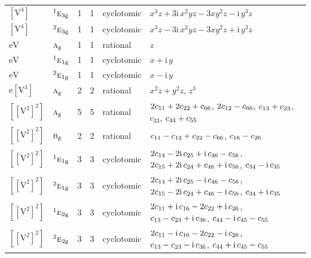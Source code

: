\documentclass[10pt,a4paper]{article}
\numberwithin{equation}{section}
\newcommand{\irr}[1]{\text{\normalfont\scshape #1}}
\newcommand{\conjpair}[1]{{}^{#1}}
\newcommand{\ptag}[1]{\mathrm{#1}}
\newcommand{\iunit}{\mathrm{i}}
\newcommand{\jahn}[1]{\mathrm{#1}}
\newlength{\fillwidth}\newlength{\cellwidth}\newlength{\colwidth}
\newcommand{\signbreak}{\penalty100\relax}
\begin{document}
{\begin{longtable}{@{}llrrl>{\RaggedRight\arraybackslash}p{\fillwidth}@{}}
$\jahn{[V^{4}]}$ & $\conjpair{1}\irr{e}_{3\ptag{g}}$ & 1 & 1 & cyclotomic & $x^{3}z + 3\iunit{}\,x^{2}yz - 3xy^{2}z - \iunit{}\,y^{3}z$\\
$\jahn{[V^{4}]}$ & $\conjpair{2}\irr{e}_{3\ptag{g}}$ & 1 & 1 & cyclotomic & $x^{3}z - 3\iunit{}\,x^{2}yz - 3xy^{2}z + \iunit{}\,y^{3}z$\\
$\jahn{eV}$ & $\irr{a}_{\ptag{g}}$ & 1 & 1 & rational & $z$\\
$\jahn{eV}$ & $\conjpair{1}\irr{e}_{1\ptag{g}}$ & 1 & 1 & cyclotomic & $x + \iunit{}\,y$\\
$\jahn{eV}$ & $\conjpair{2}\irr{e}_{1\ptag{g}}$ & 1 & 1 & cyclotomic & $x - \iunit{}\,y$\\
$\jahn{e[V^{3}]}$ & $\irr{a}_{\ptag{g}}$ & 2 & 2 & rational & $x^{2}z + y^{2}z$, $z^{3}$\\
$\jahn{[[V^{2}]^{2}]}$ & $\irr{a}_{\ptag{g}}$ & 5 & 5 & rational & $2c_{11} +\signbreak 2c_{22} +\signbreak c_{66}$, $2c_{12} -\signbreak c_{66}$, $c_{13} +\signbreak c_{23}$, $c_{33}$, $c_{44} +\signbreak c_{55}$\\
$\jahn{[[V^{2}]^{2}]}$ & $\irr{b}_{\ptag{g}}$ & 2 & 2 & rational & $c_{11} -\signbreak c_{12} +\signbreak c_{22} -\signbreak c_{66}$, $c_{16} -\signbreak c_{26}$\\
$\jahn{[[V^{2}]^{2}]}$ & $\conjpair{1}\irr{e}_{1\ptag{g}}$ & 3 & 3 & cyclotomic & $2c_{14} -\signbreak 2\iunit{}\,c_{25} +\signbreak \iunit{}\,c_{46} -\signbreak c_{56}$, $2c_{15} +\signbreak 2\iunit{}\,c_{24} +\signbreak c_{46} +\signbreak \iunit{}\,c_{56}$, $c_{34} -\signbreak \iunit{}\,c_{35}$\\
$\jahn{[[V^{2}]^{2}]}$ & $\conjpair{2}\irr{e}_{1\ptag{g}}$ & 3 & 3 & cyclotomic & $2c_{14} +\signbreak 2\iunit{}\,c_{25} -\signbreak \iunit{}\,c_{46} -\signbreak c_{56}$, $2c_{15} -\signbreak 2\iunit{}\,c_{24} +\signbreak c_{46} -\signbreak \iunit{}\,c_{56}$, $c_{34} +\signbreak \iunit{}\,c_{35}$\\
$\jahn{[[V^{2}]^{2}]}$ & $\conjpair{1}\irr{e}_{2\ptag{g}}$ & 3 & 3 & cyclotomic & $2c_{11} +\signbreak \iunit{}\,c_{16} -\signbreak 2c_{22} +\signbreak \iunit{}\,c_{26}$, $c_{13} -\signbreak c_{23} +\signbreak \iunit{}\,c_{36}$, $c_{44} -\signbreak \iunit{}\,c_{45} -\signbreak c_{55}$\\
$\jahn{[[V^{2}]^{2}]}$ & $\conjpair{2}\irr{e}_{2\ptag{g}}$ & 3 & 3 & cyclotomic & $2c_{11} -\signbreak \iunit{}\,c_{16} -\signbreak 2c_{22} -\signbreak \iunit{}\,c_{26}$, $c_{13} -\signbreak c_{23} -\signbreak \iunit{}\,c_{36}$, $c_{44} +\signbreak \iunit{}\,c_{45} -\signbreak c_{55}$\\

\end{longtable}}
\end{document}
